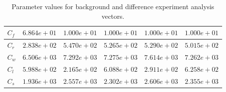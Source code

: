 \documentclass[11pt]{article}
\begin{document}
\begin{table}[ht]
\begin{center}
\begin{tabular}{| l | l | l | l | l | l |}
$C_{f}$ & $6.864e+01$ & $1.000e+01$ & $1.000e+01$ & $1.000e+01$ & $1.000e+01$ \\ \hline
$C_{r}$ & $2.838e+02$ & $5.470e+02$ & $5.265e+02$ & $5.290e+02$ & $5.015e+02$ \\ \hline
$C_{w}$ & $6.506e+03$ & $7.292e+03$ & $7.275e+03$ & $7.614e+03$ & $7.262e+03$ \\ \hline
$C_{l}$ & $5.988e+02$ & $2.165e+02$ & $6.088e+02$ & $2.911e+02$ & $6.258e+02$ \\ \hline
$C_{s}$ & $1.936e+03$ & $2.557e+03$ & $2.302e+03$ & $2.606e+03$ & $2.355e+03$ \\ \hline
	\end{tabular}
	\caption{Parameter values for background and difference experiment analysis vectors.}
	\label{table:exps_tab}
\end{center} 
\end{table}
\end{document}
